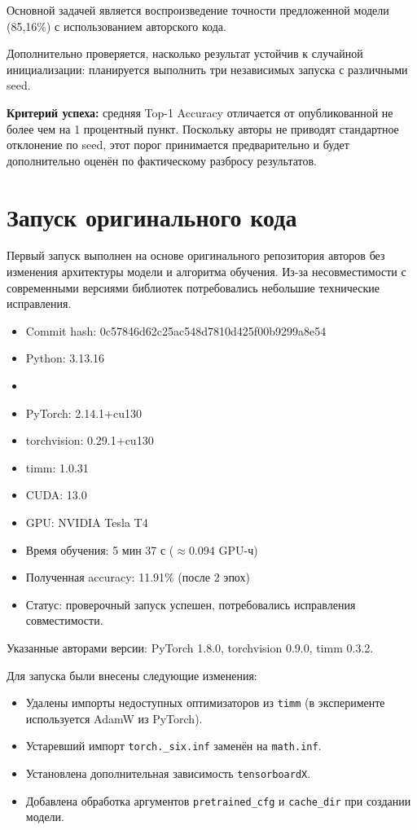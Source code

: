 \documentclass[11pt,a4paper]{article}
\begin{document}
 
Основной задачей является воспроизведение точности предложенной модели (85,16\%) с использованием авторского кода.

Дополнительно проверяется, насколько результат устойчив к случайной инициализации: планируется выполнить три независимых запуска с различными seed.

\textbf{Критерий успеха:}
средняя Top-1 Accuracy отличается от опубликованной не более чем на 1 процентный пункт. Поскольку авторы не приводят стандартное отклонение по seed, этот порог принимается предварительно и будет дополнительно оценён по фактическому разбросу результатов. 


\section{Запуск оригинального кода}

Первый запуск выполнен на основе оригинального
репозитория авторов без изменения архитектуры модели
и алгоритма обучения. Из-за несовместимости
с современными версиями библиотек потребовались
небольшие технические исправления.

\begin{itemize}
    \item Commit hash: 0c57846d62c25ac548d7810d425f00b9299a8e54 
    \item Python: 3.13.16
    \item \item PyTorch: 2.14.1+cu130
    \item torchvision: 0.29.1+cu130
    \item timm: 1.0.31
    \item CUDA: 13.0
    \item GPU: NVIDIA Tesla T4
    \item Время обучения: 5 мин 37 с
          ($\approx 0.094$ GPU-ч)
    \item Полученная accuracy: 11.91\%
          (после 2 эпох)
    \item Статус: проверочный запуск успешен,
          потребовались исправления совместимости.
\end{itemize}

Указанные авторами версии:
PyTorch 1.8.0, torchvision 0.9.0,
timm 0.3.2.

Для запуска были внесены следующие изменения:
\begin{itemize}
    \item Удалены импорты недоступных оптимизаторов
          из \texttt{timm} (в эксперименте
          используется AdamW из PyTorch).
    \item Устаревший импорт
          \texttt{torch.\_six.inf}
          заменён на \texttt{math.inf}.
    \item Установлена дополнительная зависимость
          \texttt{tensorboardX}.
    \item Добавлена обработка аргументов
          \texttt{pretrained\_cfg} и
          \texttt{cache\_dir} при создании модели.
\end{itemize}
\end{document}
